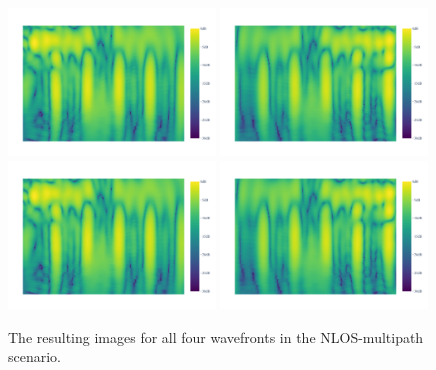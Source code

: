 \begin{figure}[H]
    \vspace{-1em} %
    \includegraphics[page=2, width=0.49\textwidth]{figures/multipath_nlos_wavefront3.pdf}
    \includegraphics[page=2, width=0.49\textwidth]{figures/multipath_nlos_wavefront4.pdf}
    \vspace{-1em} %
    \includegraphics[page=1, width=0.49\textwidth]{figures/multipath_nlos_wavefront3.pdf}
    \includegraphics[page=1, width=0.49\textwidth]{figures/multipath_nlos_wavefront4.pdf}
    \caption{The resulting images for all four wavefronts in the NLOS-multipath scenario.}\label{fig:MultipathNLOS_results}
\end{figure}

